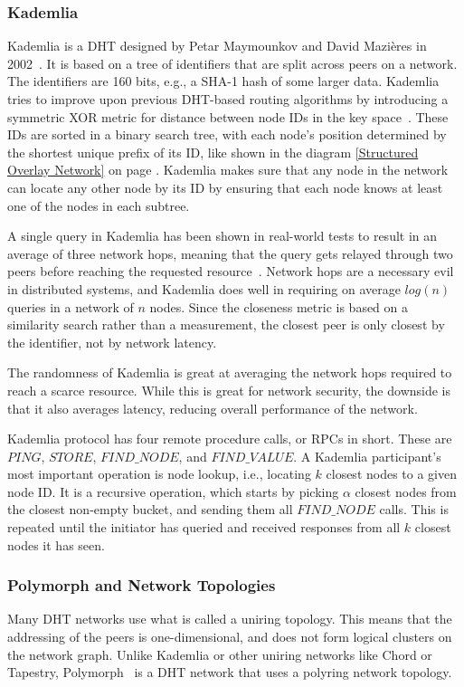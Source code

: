\subsubsection{Kademlia}
Kademlia is a DHT designed by Petar Maymounkov and David Mazières in 2002~\cite{Maymounkov2002-sx}. It is based on a tree of identifiers that are split across peers on a network. The identifiers are 160 bits, e.g., a SHA-1 hash of some larger data. Kademlia tries to improve upon previous DHT-based routing algorithms by introducing a symmetric XOR metric for distance between node IDs in the key space~\cite{Maymounkov2002-sx}. These IDs are sorted in a binary search tree, with each node's position determined by the shortest unique prefix of its ID, like shown in the diagram \ref{Structured Overlay Network} on page \pageref{Structured Overlay Network}. Kademlia makes sure that any node in the network can locate any other node by its ID by ensuring that each node knows at least one of the nodes in each subtree.

A single query in Kademlia has been shown in real-world tests to result in an average of three network hops, meaning that the query gets relayed through two peers before reaching the requested resource~\cite{Roos2013-mb}. Network hops are a necessary evil in distributed systems, and Kademlia does well in requiring on average \(log(n)\) queries in a network of \(n\) nodes. Since the closeness metric is based on a similarity search rather than a measurement, the closest peer is only closest by the identifier, not by network latency.~\cite{Eigenmann2020-zm}

The randomness of Kademlia is great at averaging the network hops required to reach a scarce resource. While this is great for network security, the downside is that it also averages latency, reducing overall performance of the network.

Kademlia protocol has four remote procedure calls, or RPCs in short. These are \(\mathit{PING}\), \(\mathit{STORE}\), \(\mathit{FIND\_NODE}\), and \(\mathit{FIND\_VALUE}\). A Kademlia participant's most important operation is node lookup, i.e., locating \(k\) closest nodes to a given node ID. It is a recursive operation, which starts by picking \(\alpha\) closest nodes from the closest non-empty bucket, and sending them all \(\mathit{FIND\_NODE}\) calls. This is repeated until the initiator has queried and received responses from all \(k\) closest nodes it has seen.

\subsubsection{Polymorph and Network Topologies}
Many DHT networks use what is called a uniring topology. This means that the addressing of the peers is one-dimensional, and does not form logical clusters on the network graph. Unlike Kademlia or other uniring networks like Chord or Tapestry, Polymorph~\cite{Jenkov_undated-kl} is a DHT network that uses a polyring network topology.

